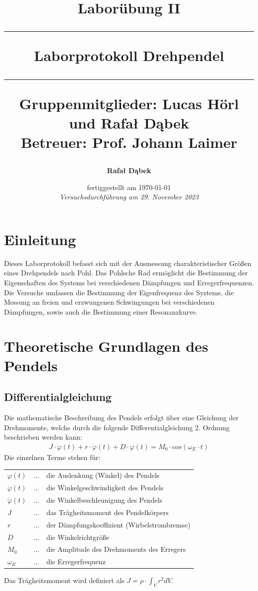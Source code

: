 \documentclass{article}
\title{
    \LARGE \textbf{Laborübung II}
    \vspace{0.5cm}
    \hrule height 2pt
    \vspace{0.5cm}
    \textbf{Laborprotokoll Drehpendel}
    \vspace{0.5cm}
    \hrule height 2pt
    \vspace*{15\baselineskip}
    {
        \small Gruppenmitglieder: Lucas Hörl und Rafał Dąbek
        \\
		Betreuer: Prof. Johann Laimer
    }

}
\author{
    \textbf{Rafał Dąbek}
}
\date{
    fertiggestellt am \today \\
    \textit{Versuchsdurchführung am 29. November 2023}
}
\begin{document}
\maketitle
\clearpage

\tableofcontents
\clearpage

\section{Einleitung}
Dieses Laborprotokoll befasst sich mit der Ausmessung charakteristischer Größen eines Drehpendels nach Pohl. Das Pohlsche Rad
ermöglicht die Bestimmung der Eigenschaften des Systems bei verschiedenen Dämpfungen und Erregerfrequenzen.
Die Versuche umfassen die Bestimmung der Eigenfrequenz des Systems, die Messung an freien und erzwungenen Schwingungen bei verschiedenen Dämpfungen,
sowie auch die Bestimmung einer Resonanzkurve.

\section{Theoretische Grundlagen des Pendels}
\subsection{Differentialgleichung}
Die mathematische Beschreibung des Pendels erfolgt über eine Gleichung der Drehmomente, welche durch die folgende
Differentialgleichung 2. Ordnung beschrieben werden kann:
\begin{gather} \label{eq:pendel}
    J \cdot \ddot \varphi(t) + r \cdot \dot \varphi(t) + D \cdot \varphi(t) = M_{0} \cdot cos(\omega_{E} \cdot t)
\end{gather}
Die einzelnen Terme stehen für:
\begin{flushleft}
\begin{tabular}{lc@{ }l}
    $\varphi(t)$ & ... & die Auslenkung (Winkel) des Pendels\\
    $\dot \varphi(t)$ & ... & die Winkelgeschwindigkeit des Pendels\\
    $\ddot \varphi(t)$ & ... & die Winkelbeschleunigung des Pendels\\
    $J$ & ... & das Trägheitsmoment des Pendelkörpers\\
    $r$ & ... & der Dämpfungskoeffizient (Wirbelstrombremse)\\
    $D$ & ... & die Winkelrichtgröße\\
    $M_{0}$ & ... & die Amplitude des Drehmoments des Erregers\\
    $\omega_{E}$ & ... & die Erregerfrequenz
\end{tabular}
\end{flushleft}
Das Trägheitsmoment wird definiert als $J = \rho \cdot \int_{V}^{} r^{2} dV$.
\cite{w:traegheit}
\end{document}
